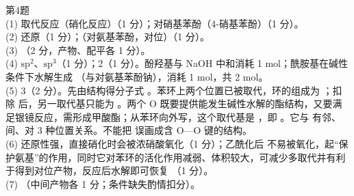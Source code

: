 \begin{jiexilist}
\item 第4题\\
(1) 取代反应（硝化反应）（1 分）；对硝基苯酚（4-硝基苯酚）（1 分）。\\
(2) 还原（1 分）；（对氨基苯酚，对位）（1 分）。\\
(3) （2 分，产物、配平各 1 分）。\\
(4) $\mathrm{sp}^2$、$\mathrm{sp}^3$（1 分）；2（1 分）。酚羟基与 NaOH 中和消耗 1 mol；酰胺基在碱性条件下水解生成 （与对氨基苯酚钠），消耗 1 mol，共 2 mol。\\
(5) 3（2 分）。先由结构得分子式 。苯环上两个位置已被取代，环的组成为 ；扣除  后，另一取代基只能为 。两个 O 既要提供能发生碱性水解的酯结构，又要满足银镜反应，需形成甲酸酯；从苯环向外写，这个取代基是 ，即 。它与  有邻、间、对 3 种位置关系。不能把  误画成含 O—O 键的结构。\\
(6)  还原性强，直接硝化时会被浓硝酸氧化（1 分）；乙酰化后  不易被氧化，起“保护氨基”的作用，同时它对苯环的活化作用减弱、体积较大，可减少多取代并有利于得到对位产物，反应后水解即可恢复 （1 分）。\\
(7) （中间产物各 1 分；条件缺失酌情扣分）。
\end{jiexilist}
